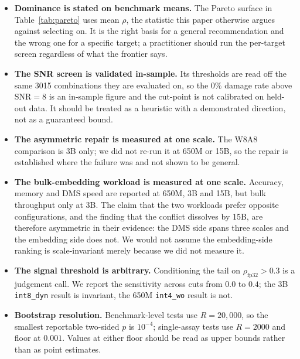 \documentclass[11pt]{article}
\newcommand{\cfg}[1]{\texttt{#1}}
\begin{document}
\begin{itemize}
        contrast for \cfg{int4\_wo} ($p = 0.0007$) clear it. The individual
        \cfg{int4\_wo} effects at 650M and 3B are nominal only
        ($p = 0.0102$, $0.0104$), and we state them as such rather than as
        established effects.
  \item \textbf{Dominance is stated on benchmark means.} The Pareto surface in
        Table~\ref{tab:pareto} uses mean $\rho$, the statistic this paper
        otherwise argues against selecting on. It is the right basis for a
        general recommendation and the wrong one for a specific target; a
        practitioner should run the per-target screen regardless of what the
        frontier says.
  \item \textbf{The SNR screen is validated in-sample.} Its thresholds are read
        off the same 3015 combinations they are evaluated on, so the $0\%$
        damage rate above $\mathrm{SNR} = 8$ is an in-sample figure and the
        cut-point is not calibrated on held-out data. It should be treated as a
        heuristic with a demonstrated direction, not as a guaranteed bound.
  \item \textbf{The asymmetric repair is measured at one scale.} The W8A8
        comparison is 3B only; we did not re-run it at 650M or 15B, so the
        repair is established where the failure was and not shown to be general.
  \item \textbf{The bulk-embedding workload is measured at one scale.} Accuracy,
        memory and DMS speed are reported at 650M, 3B and 15B, but bulk
        throughput only at 3B. The claim that the two workloads prefer opposite
        configurations, and the finding that the conflict dissolves by 15B, are
        therefore asymmetric in their evidence: the DMS side spans three scales
        and the embedding side does not. We would not assume the embedding-side
        ranking is scale-invariant merely because we did not measure it.
  \item \textbf{The signal threshold is arbitrary.} Conditioning the tail on
        $\rho_{\text{fp32}} > 0.3$ is a judgement call. We report the
        sensitivity across cuts from $0.0$ to $0.4$; the 3B \cfg{int8\_dyn}
        result is invariant, the 650M \cfg{int4\_wo} result is not.
  \item \textbf{Bootstrap resolution.} Benchmark-level tests use
        $R = 20{,}000$, so the smallest reportable two-sided $p$ is $10^{-4}$;
        single-assay tests use $R = 2000$ and floor at $0.001$. Values at either
        floor should be read as upper bounds rather than as point estimates.

\end{itemize}
\end{document}
